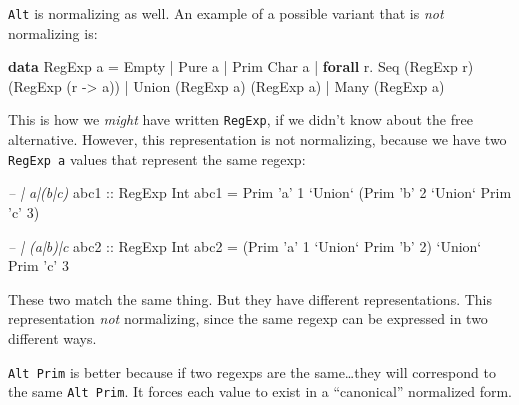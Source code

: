 \documentclass[]{article}
\newenvironment{Shaded}{}{}
\newcommand{\CharTok}[1]{\textcolor[rgb]{0.25,0.44,0.63}{#1}}
\newcommand{\CommentTok}[1]{\textcolor[rgb]{0.38,0.63,0.69}{\textit{#1}}}
\newcommand{\DataTypeTok}[1]{\textcolor[rgb]{0.56,0.13,0.00}{#1}}
\newcommand{\DecValTok}[1]{\textcolor[rgb]{0.25,0.63,0.44}{#1}}
\newcommand{\FunctionTok}[1]{\textcolor[rgb]{0.02,0.16,0.49}{#1}}
\newcommand{\KeywordTok}[1]{\textcolor[rgb]{0.00,0.44,0.13}{\textbf{#1}}}
\newcommand{\NormalTok}[1]{#1}
\newcommand{\OtherTok}[1]{\textcolor[rgb]{0.00,0.44,0.13}{#1}}
\begin{document}
\texttt{Alt} is normalizing as well. An example of a possible variant that is
\emph{not} normalizing is:

\begin{Shaded}
\begin{Highlighting}[]
\KeywordTok{data} \DataTypeTok{RegExp}\NormalTok{ a }\FunctionTok{=} \DataTypeTok{Empty}
              \FunctionTok{|} \DataTypeTok{Pure}\NormalTok{ a}
              \FunctionTok{|} \DataTypeTok{Prim} \DataTypeTok{Char}\NormalTok{ a}
              \FunctionTok{|} \KeywordTok{forall}\NormalTok{ r}\FunctionTok{.} \DataTypeTok{Seq}\NormalTok{ (}\DataTypeTok{RegExp}\NormalTok{ r) (}\DataTypeTok{RegExp}\NormalTok{ (r }\OtherTok{->}\NormalTok{ a))}
              \FunctionTok{|} \DataTypeTok{Union}\NormalTok{ (}\DataTypeTok{RegExp}\NormalTok{ a) (}\DataTypeTok{RegExp}\NormalTok{ a)}
              \FunctionTok{|} \DataTypeTok{Many}\NormalTok{ (}\DataTypeTok{RegExp}\NormalTok{ a)}
\end{Highlighting}
\end{Shaded}

This is how we \emph{might} have written \texttt{RegExp}, if we didn't know
about the free alternative. However, this representation is not normalizing,
because we have two \texttt{RegExp\ a} values that represent the same regexp:

\begin{Shaded}
\begin{Highlighting}[]
\CommentTok{-- | a|(b|c)}
\OtherTok{abc1 ::} \DataTypeTok{RegExp} \DataTypeTok{Int}
\NormalTok{abc1 }\FunctionTok{=} \DataTypeTok{Prim} \CharTok{'a'} \DecValTok{1} \OtherTok{`Union`}\NormalTok{ (}\DataTypeTok{Prim} \CharTok{'b'} \DecValTok{2} \OtherTok{`Union`} \DataTypeTok{Prim} \CharTok{'c'} \DecValTok{3}\NormalTok{)}

\CommentTok{-- | (a|b)|c}
\OtherTok{abc2 ::} \DataTypeTok{RegExp} \DataTypeTok{Int}
\NormalTok{abc2 }\FunctionTok{=}\NormalTok{ (}\DataTypeTok{Prim} \CharTok{'a'} \DecValTok{1} \OtherTok{`Union`} \DataTypeTok{Prim} \CharTok{'b'} \DecValTok{2}\NormalTok{) }\OtherTok{`Union`} \DataTypeTok{Prim} \CharTok{'c'} \DecValTok{3}
\end{Highlighting}
\end{Shaded}

These two match the same thing. But they have different representations. This
representation \emph{not} normalizing, since the same regexp can be expressed in
two different ways.

\texttt{Alt\ Prim} is better because if two regexps are the same\ldots{}they
will correspond to the same \texttt{Alt\ Prim}. It forces each value to exist in
a ``canonical'' normalized form.
\end{document}
